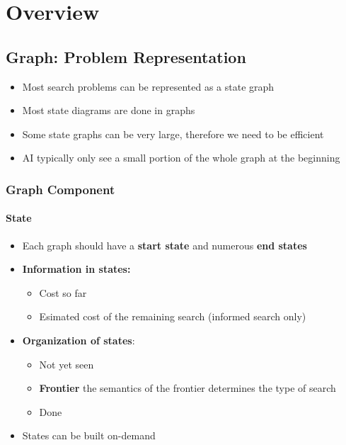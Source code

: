 \section{Overview}

  \subsection{Graph: Problem Representation}

    \begin{itemize}
      \item Most search problems can be represented as a state graph
      \item Most state diagrams are done in graphs
      \item Some state graphs can be very large, therefore we need to be efficient
      \item AI typically only see a small portion of the whole graph at the beginning
    \end{itemize}

    \subsubsection{Graph Component}

      \paragraph{State}
      \begin{itemize}
        \item Each graph should have a \textbf{start state} and numerous
        \textbf{end states}
        \item \textbf{Information in states:}
        \begin{itemize}
          \item Cost so far
          \item Esimated cost of the remaining search (informed search only)
        \end{itemize}

        \item \textbf{Organization of states}:
        \begin{itemize}
          \item Not yet seen
          \item \textbf{Frontier} the semantics of the frontier determines
          the type of search
          \item Done
        \end{itemize}

        \item States can be built on-demand
      \end{itemize}

